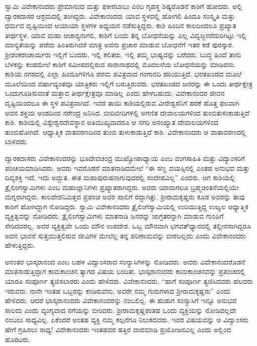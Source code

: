  ಸ್ವಾಮಿ ವಿವೇಕಾನಂದರು ಪ್ರೇಮಾನಂದ ಮತ್ತು ಫಕೀರಬಾಬು ಎಂಬ ಗೃಹಸ್ಥ ಶಿಷ್ಯರೊಡನೆ ಕಾಶಿಗೆ ಹೋದರು. ಅಲ್ಲಿ ದ್ವಾರಕದಾಸರ ಆಶ್ರಮದಲ್ಲಿ ತಂಗಿದ್ದರು. ವಿವೇಕಾನಂದರು ಯಾವ ಸ್ಥಳದಲ್ಲಿ ಹೋಗಲಿ ಹಿಂದೂ ಸಂಸ್ಕೃತಿ ಮತ್ತು ಧರ್ಮದ ದೃಷ್ಟಿಯಿಂದ ಆಯಾಯಾ ಸ್ಥಳಗಳ ಅಧ್ಯಯನ ನಡೆಸುತ್ತಿದ್ದರು. ಕಾಶಿ ಹಿಂದಿನ ಕಾಲದಿಂದಲೂ ಪ್ರಖ್ಯಾತ ತೀರ್ಥಸ್ಥಳ. ಯಾವ ಮಹಾ ಆಚಾರ‍್ಯನಾಗಲಿ, ಕಾಶಿಗೆ ಬಂದು ತನ್ನ ಬೋಧನೆಯನ್ನು ಎಲ್ಲ ವಿದ್ವಜ್ಜನರೆದುರಿಗಿಟ್ಟು ಇಲ್ಲಿ ಮಾನ್ಯತೆಯನ್ನು ಪಡೆದು ಹಿಂತಿರುಗಿದರೆ ಮಾತ್ರ ಅವನು ಪ್ರಚಾರ ಮಾಡುವ ಬೋಧನೆಗೆ ಇತರ ಕಡೆ ಪುರಸ್ಕಾರ. ಶ‍್ರೀಶಂಕರಾಚಾರ್ಯರು ಇಲ್ಲಿಗೆ ಬಂದರು, ಇಲ್ಲಿ ಕಲಿತರು, ಇಲ್ಲಿ ತಮ್ಮ ಭಾಷ್ಯವನ್ನು ಬರೆದರು. ಬುದ್ಧ ಹಿಂದೆ ತಾನು ಬೆಳಕನ್ನು ಕಂಡಮೇಲೆ ಕಾಶಿಗೆ ಸಮೀಪದಲ್ಲಿರುವ ಸಾರಾನಾಥದಲ್ಲಿ ಮೊದಲನೆಯ ಬೋಧನೆಯನ್ನು ಮಾಡಿದನು. ಕಾಶಿಯ ನಗರದಲ್ಲಿ ಎಲ್ಲಾ ಹಿಂದೂಗಳಿಗೂ ಪರಮ ಪವಿತ್ರವಾದ ಗಂಗಾನದಿ ಹರಿಯುತ್ತಿದೆ. ಭರತಖಂಡದ ಮೂಲೆ ಮೂಲೆಯಿಂದ ವರ್ಷಾದ್ಯಂತವೂ ಯಾತ್ರಿಕರು ಇಲ್ಲಿಗೆ ಬರುತ್ತಿರುವರು. ಭರತಖಂಡದ ಜನರನ್ನು ಈ ಒಂದು ತೀರ್ಥಕ್ಷೇತ್ರ ಒಂದುಗೂಡಿಸುವಂತೆ ಮತ್ತಾವ ತೀರ್ಥಕ್ಷೇತ್ರವೂ ಮಾಡಿಲ್ಲ ಎಂದು ಹೇಳಬಹುದು. ವಿವೇಕಾನಂದರ ಜೀವನ ದೃಷ್ಟಿಯಿಂದಲೂ ಈ ಸ್ಥಳ ಪವಿತ್ರವಾಗಿದೆ. ಇವರ ತಾಯಿ ಕಾಶಿಯಲ್ಲಿರುವ ವೀರೇಶ್ವರನಿಗೆ ಹರಕೆ ಹೊತ್ತ ಫಲವಾಗಿ ಅವನ ಶಕ್ತಿಯ ಅಂಶದಿಂದ ನರೇಂದ್ರ ಜನಿಸಿದ. ಬೀದಿಬೀದಿಗಳಲ್ಲಿ ಅಗಣಿತ ದೇವಾಲಯಗಳಿಂದ ತುಂಬಿತುಳುಕಾಡುತ್ತಿದೆ ಕಾಶಿ. ಕಾಶಿಯಲ್ಲಿ ವಿಶ್ವೇಶ್ವರದೇವಸ್ಥಾನ ಅತಿಮುಖ್ಯವಾದರೂ ಆ ನಗರಿ ಅಸಂಖ್ಯಾತ ದೇವಾಲಯಗಳಿಂದ ತುಂಬಿಹೋಗಿದೆ. ಆಧ್ಯಾತ್ಮಿಕ ವಾತವರಣದಿಂದ ತುಂಬಿ ತುಳುಕಾಡುತ್ತಿದೆ ಕಾಶಿ. ವಿವೇಕಾನಂದರು ಆ ವಾತಾವರಣದಲ್ಲಿ ಬಾಳಿದರು. 

 ದ್ವಾರಕದಾಸರು ವಿವೇಕಾನಂದರನ್ನು ಭೂದೇವಚಂದ್ರ ಮುಖ್ಯೋಪಾಧ್ಯಾಯ ಎಂಬ ವಂಗಸಾಹಿತಿ ಮತ್ತು ವಿದ್ಯಾಂಸರಿಗೆ ಪರಿಚಯಮಾಡಿಸಿದರು. ಅವರು ಇವರೊಡನೆ ಮಾತನಾಡಿದಮೇಲೆ “ಈ ಸಣ್ಣ ವಯಸ್ಸಿನಲ್ಲಿ ಎಂತಹ ಅನುಭವ ಮತ್ತು ದಿವ್ಯಶಕ್ತಿ ಇದೆ, ಇದು ಅದ್ಭುತ. ಈತ ಮಹಾಪುರುಷನಾಗುವುದರಲ್ಲಿ ಸಂದೇಹವಿಲ್ಲ” ಎಂದರು. ಆಗ ಕಾಶಿಯಲ್ಲಿ ತ್ರೈಲಿಂಗಸ್ವಾಮಿಗಳು ಎಂಬ ಮಹಾಜ್ಞಾನಿಗಳು ಪ್ರಖ್ಯಾತರಾಗಿದ್ದರು. ಅವರು ಯಾವಾಗಲೂ ಬ್ರಹ್ಮಚಿಂತನೆಯಲ್ಲಿಯೇ ಮಗ್ನರಾಗಿದ್ದರು. ಕಾಲದೇಶನಿಮಿತ್ತದ ಪ್ರಪಂಚ ಅವರ ಪಾಲಿಗೆ ರದ್ದಾಗಿತ್ತು. ಶ‍್ರೀರಾಮಕೃಷ್ಣರು ಕೂಡ ಅವರನ್ನು ತಾವು ಕಾಶಿಗೆ ಹೋಗಿದ್ದಾಗ ನೋಡಿದ್ದರು. ಸ್ವಾಮಿ ವಿವೇಕಾನಂದರು ತ್ರೈಲಿಂಗಸ್ವಾಮಿಯಲ್ಲಿ ಉರಿಯುತ್ತಿದ್ದ ಉಜ್ವಲ ಆಧ್ಯಾತ್ಮಿಕ ವ್ಯಕ್ತಿತ್ವವನ್ನು ನೋಡಿದರು. ತ್ರೈಲಿಂಗಸ್ವಾಮಿಗಳು ಮಾತನಾಡಿ ಜನರನ್ನು ಜಾಗ್ರತರನ್ನಾಗಿ ಮಾಡುವ ಗುಂಪಿಗೆ ಸೇರಿದವರಲ್ಲ. ಅವರ ವ್ಯಕ್ತಿತ್ವವೇ ಒಂದು ಮೌನ ಉಪದೇಶ. ಒಬ್ಬ ಮೌನವಾಗಿ ಭಗವತ್​ಧ್ಯಾನದಲ್ಲಿ ತಲ್ಲೀನನಾಗಿದ್ದರೂ ಅವನ ಭಾವನೆ ಸುತ್ತಮುತ್ತಲಿರುವ ಜೀವಿಗಳ ಮೇಲೆಲ್ಲ ತನ್ನ ಪರಿಣಾಮವನ್ನು ಬೀರಬಲ್ಲದು ಎಂದು ವಿವೇಕಾನಂದರು ಹೇಳುತ್ತಿದ್ದರು.

 ಅನಂತರ ಭಾಸ್ಕರಾನಂದ ಎಂಬ ಬಹಳ ವಿದ್ವಾಂಸರಾದ ಸಂನ್ಯಾಸಿಗಳನ್ನು ನೋಡಿದರು. ಅವರು ವಿವೇಕಾನಂದರೊಡನೆ ಮಾತನಾಡುತ್ತಿದ್ದಾಗ ಕಾಮಕಾಂಚನ ತ್ಯಾಗದ ವಿಷಯ ಬಂದಿತು. ಭಾಸ್ಕರಾನಂದರು ಕಾಮಕಾಂಚನವನ್ನು ಪ್ರಪಂಚದಲ್ಲಿ ಯಾರೂ ಸಂಪೂರ್ಣ ತ್ಯಜಿಸಲಾರರು ಎಂದು ಹೇಳಿದರು. ವಿವೇಕಾನಂದರು, “ಹಾಗೆ ಸಂಪೂರ್ಣ ತ್ಯಜಿಸಿದವರು ಹಲವರು ಇರುವರು. ನಾನೇ ಇಂತಹ ಒಬ್ಬರನ್ನು ಕಂಡಿರುವೆನು, ಅವರೇ ನಮ್ಮ ಗುರುಗಳಾದ ಶ‍್ರೀರಾಮಕೃಷ್ಣರು” ಎಂದು ಹೇಳಿದರು. ಆದರೆ ಭಾಸ್ಕರಾನಂದರು ವಿವೇಕಾನಂದರನ್ನು ನಂಬಲಿಲ್ಲ. ಈ ಹುಡುಗ ಸಂನ್ಯಾಸಿಗೆ ಇನ್ನೂ ಅನುಭವ ಸಾಲದು ಎಂದು ವ್ಯಂಗ್ಯವಾದ ನಗೆಯನ್ನು ಬೀರಿದರು. ಶ‍್ರೀರಾಮಕೃಷ್ಣರಂತಹ ಒಂದು ವ್ಯಕ್ತಿಯನ್ನು ನೋಡಿದಲ್ಲದೇ ನಂಬಲು ಸಾಧ್ಯವಿಲ್ಲ. ಏಕೆಂದರೆ ಅಂತಹ ವ್ಯಕ್ತಿ ನಮ್ಮ ಕಲ್ಪನೆಗೂ ನಿಲುಕದವರು. ಇವರ ವಿಷಯವನ್ನು ಆ ವಿದ್ವಾಂಸರು ಹೇಗೆ ಗ್ರಹಿಸಲು ಸಾಧ್ಯ! ವಿವೇಕಾನಂದರು ಇಂತಹವರ ಹತ್ತಿರ ವಾದಮಾಡಿ ಪ್ರಯೋಜನವಿಲ್ಲ ಎಂದು ಅಲ್ಲಿಂದ ಹೊರಟರು. 

